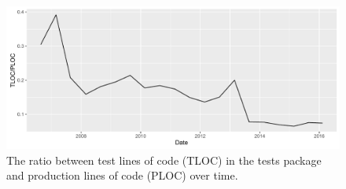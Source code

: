 \begin{figure}[h!]
	\centering
	\includegraphics[width=0.95\columnwidth]{images/problem_description/tests_ratio_tribler}
	\caption{The ratio between test lines of code (TLOC) in the tests package and production lines of code (PLOC) over time.}
	\label{fig:tests-ratio-tribler}
\end{figure}


